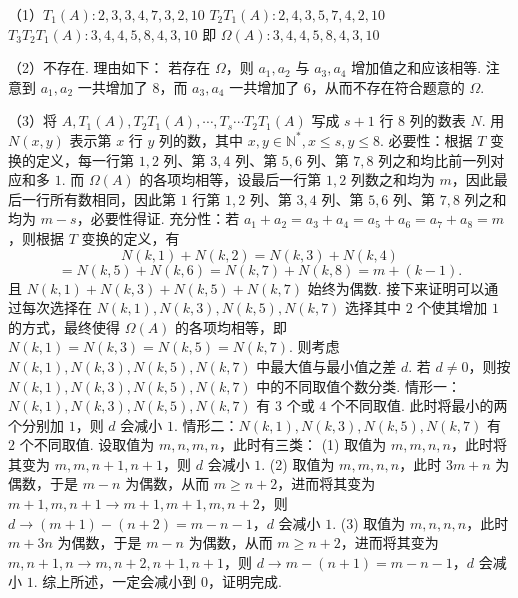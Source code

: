\begin{solutions}
（1）$ T_1(A):2,3,3,4,7,3,2,10 $
$ T_2T_1(A):2,4,3,5,7,4,2,10 $
$ T_3T_2T_1(A):3,4,4,5,8,4,3,10 $
即 $ \Omega(A):3,4,4,5,8,4,3,10 $

（2）不存在. 理由如下：
若存在 $ \Omega $，则 $ a_1,a_2 $ 与 $ a_3,a_4 $ 增加值之和应该相等.
注意到 $ a_1,a_2 $ 一共增加了 $ 8 $，而 $ a_3,a_4 $ 一共增加了 $ 6 $，从而不存在符合题意的 $ \Omega $.

（3）将 $ A, T_1(A), T_2T_1(A), \cdots, T_s\cdots T_2T_1(A) $ 写成 $ s+1 $ 行 $ 8 $ 列的数表 $ N $.
用 $ N(x,y) $ 表示第 $ x $ 行 $ y $ 列的数，其中 $ x,y\in\mathbb{N}^*,x\leqslant s,y\leqslant 8 $.
必要性：根据 $ T $ 变换的定义，每一行第 $ 1,2 $ 列、第 $ 3,4 $ 列、第 $ 5,6 $ 列、第 $ 7,8 $ 列之和均比前一列对应和多 $ 1 $. 而 $ \Omega(A) $ 的各项均相等，设最后一行第 $ 1,2 $ 列数之和均为 $ m $，因此最后一行所有数相同，因此第 $ 1 $ 行第 $ 1,2 $ 列、第 $ 3,4 $ 列、第 $ 5,6 $ 列、第 $ 7,8 $ 列之和均为 $ m-s $，必要性得证.
充分性：若 $ a_1+a_2=a_3+a_4=a_5+a_6=a_7+a_8=m $，则根据 $ T $ 变换的定义，有
$$ N(k,1)+N(k,2)=N(k,3)+N(k,4) $$
$$ =N(k,5)+N(k,6)=N(k,7)+N(k,8)=m+(k-1). $$
且 $ N(k,1)+N(k,3)+N(k,5)+N(k,7) $ 始终为偶数.
接下来证明可以通过每次选择在 $ N(k,1),N(k,3),N(k,5),N(k,7) $ 选择其中 $ 2 $ 个使其增加 $ 1 $ 的方式，最终使得 $ \Omega(A) $ 的各项均相等，即 $ N(k,1)=N(k,3)=N(k,5)=N(k,7) $.
则考虑 $ N(k,1),N(k,3),N(k,5),N(k,7) $ 中最大值与最小值之差 $ d $.
若 $ d\neq 0 $，则按 $ N(k,1),N(k,3),N(k,5),N(k,7) $ 中的不同取值个数分类.
情形一：$ N(k,1),N(k,3),N(k,5),N(k,7) $ 有 $ 3 $ 个或 $ 4 $ 个不同取值.
此时将最小的两个分别加 $ 1 $，则 $ d $ 会减小 $ 1 $.
情形二：$ N(k,1),N(k,3),N(k,5),N(k,7) $ 有 $ 2 $ 个不同取值.
设取值为 $ m,n,m,n $，此时有三类：
(1) 取值为 $ m,m,n,n $，此时将其变为 $ m,m,n+1,n+1 $，则 $ d $ 会减小 $ 1 $.
(2) 取值为 $ m,m,n,n $，此时 $ 3m+n $ 为偶数，于是 $ m-n $ 为偶数，从而 $ m\geqslant n+2 $，进而将其变为 $ m+1,m,n+1\to m+1,m+1,m,n+2 $，则 $ d\to(m+1)-(n+2)=m-n-1 $，$ d $ 会减小 $ 1 $.
(3) 取值为 $ m,n,n,n $，此时 $ m+3n $ 为偶数，于是 $ m-n $ 为偶数，从而 $ m\geqslant n+2 $，进而将其变为 $ m,n+1,n\to m,n+2,n+1,n+1 $，则 $ d\to m-(n+1)=m-n-1 $，$ d $ 会减小 $ 1 $.
综上所述，一定会减小到 $ 0 $，证明完成.
\end{solutions}